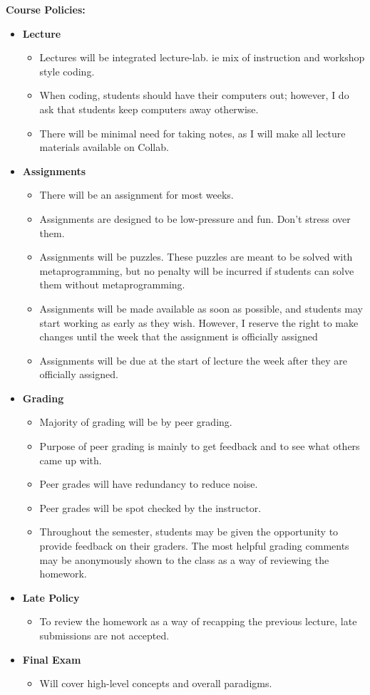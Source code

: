 \documentclass[11pt]{article}
\begin{document}
\textbf {\large Course Policies:}
\begin{itemize}
	\item \textbf {Lecture}
		\begin{itemize}
			\item Lectures will be integrated lecture-lab. ie mix of instruction and workshop style coding. 
			\item When coding, students should have their computers out; however, I do ask that students keep computers away otherwise. 
			\item There will be minimal need for taking notes, as I will make all lecture materials available on Collab.
		\end{itemize}
		\item \textbf {Assignments}
		\begin{itemize}
			\item There will be an assignment for most weeks. 
			\item Assignments are designed to be low-pressure and fun. Don't stress over them.
			\item Assignments will be puzzles. These puzzles are meant to be solved with metaprogramming, but no penalty will be incurred if students can solve them without metaprogramming.
			\item Assignments will be made available as soon as possible, and students may start working as early as they wish. However, I reserve the right to make changes until the week that the assignment is officially assigned
			\item Assignments will be due at the start of lecture the week after they are officially assigned.
		\end{itemize}
		\item \textbf {Grading}
		\begin{itemize}
			\item Majority of grading will be by peer grading.
			\item Purpose of peer grading is mainly to get feedback and to see what others came up with.
			\item Peer grades will have redundancy to reduce noise.
			\item Peer grades will be spot checked by the instructor.
			\item Throughout the semester, students may be given the opportunity to provide feedback on their graders. The most helpful grading comments may be anonymously shown to the class as a way of reviewing the homework.
		\end{itemize}
		\item \textbf {Late Policy}
		\begin{itemize}
		\item To review the homework as a way of recapping the previous lecture, late submissions are not accepted.
		\end{itemize}
		\item \textbf {Final Exam}
		\begin{itemize}
		\item Will cover high-level concepts and overall paradigms. 
		\end{itemize}
\end{itemize}
\end{document}
